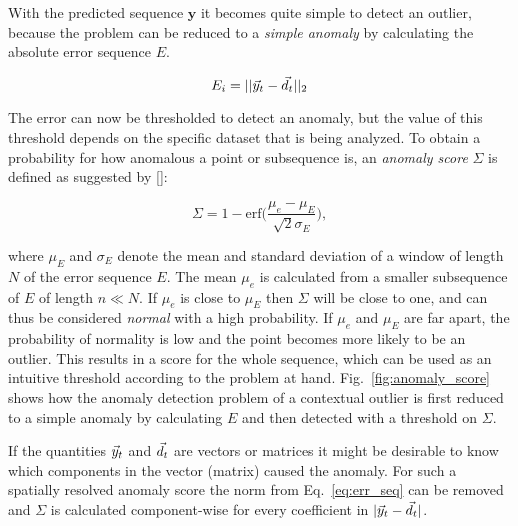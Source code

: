 With the predicted sequence $\textbf{y}$ it becomes quite simple to detect an
outlier, because the problem can be reduced to a \emph{simple anomaly} by
calculating the absolute error sequence $E$.

\begin{equation}
  \label{eq:err_seq}
  E_i = || \vec{y}_t - \vec{d}_t ||_2
\end{equation}

The error can now be thresholded to detect an anomaly, but the value of this
threshold depends on the specific dataset that is being analyzed.  To obtain a
probability for how anomalous a point or subsequence is, an \emph{anomaly
score} $\Sigma$ is defined as suggested by [\cite{numenta_realtime}]:

\begin{equation}
  \label{eq:normality_score}
  \Sigma = 1 - \text{erf}\bigg(\frac{\mu_e - \mu_E}{\sqrt{2}\sigma_E}\bigg),
\end{equation}

where $\mu_E$ and $\sigma_E$ denote the mean and standard deviation of a window
of length $N$ of the error sequence $E$. The mean $\mu_e$ is calculated from a
smaller subsequence of $E$ of length $n \ll N$. If $\mu_e$ is close to $\mu_E$
then $\Sigma$ will be close to one, and can thus be considered \emph{normal}
with a high probability. If $\mu_e$ and $\mu_E$ are far apart, the probability
of normality is low and the point becomes more likely to be an
outlier. This results in a score for the whole sequence, which can be used as
an intuitive threshold according to the problem at hand.
Fig.~\ref{fig:anomaly_score} shows how the anomaly detection problem of a
contextual outlier is first reduced to a simple anomaly by calculating $E$ and
then detected with a threshold on $\Sigma$. 

If the quantities $\vec{y}_t$ and $\vec{d}_t$ are vectors or matrices it might be
desirable to know which components in the vector (matrix) caused the anomaly.
For such a spatially resolved anomaly score the norm from Eq.~\ref{eq:err_seq}
can be removed and $\Sigma$ is calculated component-wise for every
coefficient in $|\vec{y}_t - \vec{d}_t|$.
